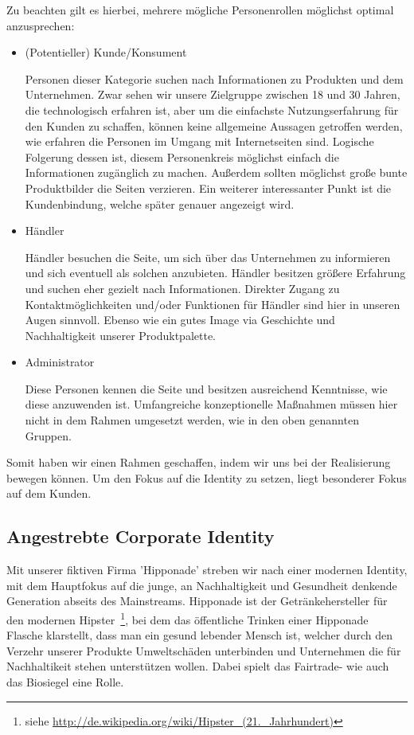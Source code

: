 \documentclass[12pt,a4paper,oneside,ngerman]{article}
\begin{document}
 Zu beachten gilt es hierbei, mehrere mögliche Personenrollen möglichst optimal anzusprechen:
\begin{itemize}
\item (Potentieller) Kunde/Konsument

Personen dieser Kategorie suchen nach Informationen zu Produkten und dem Unternehmen. 
Zwar sehen wir unsere Zielgruppe zwischen 18 und 30 Jahren, die technologisch erfahren ist, aber um die einfachste Nutzungserfahrung für den Kunden zu schaffen, können keine allgemeine Aussagen getroffen werden, wie erfahren die Personen im Umgang mit Internetseiten sind. 
Logische Folgerung dessen ist, diesem Personenkreis möglichst einfach die Informationen zugänglich zu machen. Außerdem sollten möglichst große bunte Produktbilder die Seiten verzieren. Ein weiterer interessanter Punkt ist die Kundenbindung, welche später genauer angezeigt wird. 

\item Händler

Händler besuchen die Seite, um sich über das Unternehmen zu informieren und sich eventuell als solchen anzubieten. Händler besitzen größere Erfahrung und suchen eher gezielt nach Informationen. Direkter Zugang zu Kontaktmöglichkeiten und/oder Funktionen für Händler sind hier in unseren Augen sinnvoll. Ebenso wie ein gutes Image via Geschichte und Nachhaltigkeit unserer Produktpalette.

\item Administrator

Diese Personen kennen die Seite und besitzen ausreichend Kenntnisse, wie diese anzuwenden ist.
Umfangreiche konzeptionelle Maßnahmen müssen hier nicht in dem Rahmen umgesetzt werden, wie in den oben genannten Gruppen.

\end{itemize}
Somit haben wir einen Rahmen geschaffen, indem wir uns bei der Realisierung bewegen können. Um den Fokus auf die Identity zu setzen, liegt besonderer Fokus auf dem Kunden.

\subsection{Angestrebte Corporate Identity}
Mit unserer fiktiven Firma 'Hipponade' streben wir nach einer modernen Identity, mit dem Hauptfokus auf die junge, an Nachhaltigkeit und Gesundheit denkende Generation abseits des Mainstreams.
Hipponade ist der Getränkehersteller für den modernen Hipster~\footnote{siehe \url{http://de.wikipedia.org/wiki/Hipster_(21._Jahrhundert)}}, bei dem das öffentliche Trinken einer Hipponade Flasche klarstellt, dass man ein gesund lebender Mensch ist, welcher durch den Verzehr unserer Produkte Umweltschäden unterbinden und Unternehmen die für Nachhaltikeit stehen unterstützen wollen. Dabei spielt das Fairtrade- wie auch das Biosiegel eine Rolle.
\end{document}
